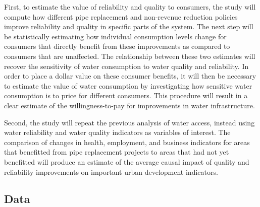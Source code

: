 \documentclass{article}
\begin{document}
First, to estimate the value of reliability and quality to consumers, the study will compute how different pipe replacement and non-revenue reduction policies improve reliability and quality in specific parts of the system.  The next step will be statistically estimating how individual consumption levels change for consumers that directly benefit from these improvements as compared to consumers that are unaffected.  The relationship between these two estimates will recover the sensitivity of water consumption to water quality and reliability.  In order to place a dollar value on these consumer benefits, it will then be necessary to estimate the value of water consumption by investigating how sensitive water consumption is to price for different consumers.  This procedure will result in a clear estimate of the willingness-to-pay for improvements in water infrastructure.

Second, the study will repeat the previous analysis of water access, instead using water reliability and water quality indicators as variables of interest.  The comparison of changes in health, employment, and business indicators for areas that benefitted from pipe replacement projects to areas that had not yet benefitted will produce an estimate of the average causal impact of quality and reliability improvements on important urban development indicators.

\subsection*{Data}
\end{document}
